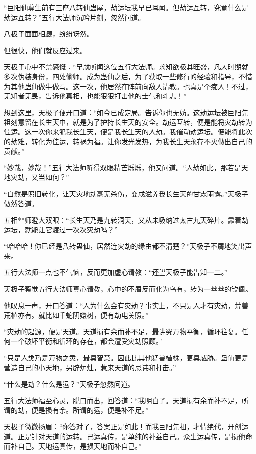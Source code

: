 \begin{this_body}
“巨阳仙尊生前有三座八转仙蛊屋，劫运坛我早已耳闻。但劫运互转，究竟什么是劫运互转？”五行大法师沉吟片刻，忽然问道。

八极子面面相觑，纷纷讶然。

但很快，他们就反应过来。

天极子心中不禁感慨：“早就听闻这位五行大法师。求知欲极其旺盛，凡人时期就多次伪装身份，四处偷师。成为蛊仙之后，为了获取一些修行的经验和指导，不惜为其他蛊仙做牛做马。这一次，他居然在阵前向敌人请教。也真是个痴人！不过，无知者无畏，告诉他真相，也能狠狠打击他的士气和斗志！”

想到这里，天极子便开口道：“如今已成定局。告诉你也无妨。这劫运坛被巨阳先祖刻意留在长生天中，就是为了护持长生天的安全。劫运互转，便是能将灾劫转为佳运。这一次你来犯我长生天，便是我长生天的人劫。我催动劫运坛。便能将此次的劫难，转化为佳运，转祸为福。让你发光发热，为我长生天永存不灭做出自己的贡献。”

“妙哉，妙哉！”五行大法师听得双眼精芒烁烁，他又问道。“人劫如此，那若是天地灾劫，又当如何？”

“自然是照旧转化，让天灾地劫毫无杀伤，变成滋养我长生天的甘霖雨露。”天极子傲然答道。

五相**师瞪大双眼：“长生天乃是九转洞天，又从未吸纳过太古九天碎片。靠着劫运坛，就能让它渡过一次次灾劫吗？”

“哈哈哈！你已经是八转蛊仙，居然连灾劫的缘由都不清楚？”天极子不屑地笑出声来。

五行大法师一点也不气恼，反而更加虚心请教：“还望天极子能告知一二。”

天极子察觉五行大法师真心请教，心中的不屑反而化为乌有，转为一丝丝的钦佩。

他叹息一声，开口答道：“人为什么会有灾劫？事实上，不只是人才有灾劫，荒兽荒植亦有。就比如千蛇阴嬛树，便有劫电关照。”

“灾劫的起源，便是天道。天道损有余而补不足，最讲究万物平衡，循环往复。任何一个破坏平衡和循环的存在，都会遭受灾劫照顾。”

“只是人类乃是万物之灵，最具智慧。因此比其他猛兽植株，更具威胁。蛊仙更是营造自己的小天地，另辟炉灶，惹来天道的忌讳和打击。”

“什么是劫？什么是运？”天极子忽然问道。

五行大法师福至心灵，脱口而出，回答道：“我明白了。天道损有余而补不足，所谓的劫，便是损有余。所谓的运，便是补不足。”

天极子微微扬眉：“你答对了，答案正是如此！而我巨阳先祖，才情绝代，开创运道。正是针对天道的运转。己运真传，是单纯的补益自己。众生运真传，是损他命而补自己。天地运真传，是损天地而补自己。”


\end{this_body}
